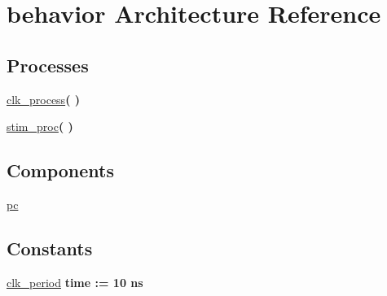 \hypertarget{class_p_counte__tb_1_1behavior}{\section{behavior \-Architecture \-Reference}
\label{class_p_counte__tb_1_1behavior}
}
\*
\*
\subsection*{\-Processes}
 \begin{DoxyCompactItemize}
\item 
\hypertarget{class_p_counte__tb_1_1behavior_ac5bb218131b813f7908ec89476b31fca}{\hyperlink{class_p_counte__tb_1_1behavior_ac5bb218131b813f7908ec89476b31fca}{clk\-\_\-process}{\bfseries  (  )}}\label{class_p_counte__tb_1_1behavior_ac5bb218131b813f7908ec89476b31fca}

\item 
\hypertarget{class_p_counte__tb_1_1behavior_ad2efa6785cff833c341e27596b21aeb5}{\hyperlink{class_p_counte__tb_1_1behavior_ad2efa6785cff833c341e27596b21aeb5}{stim\-\_\-proc}{\bfseries  (  )}}\label{class_p_counte__tb_1_1behavior_ad2efa6785cff833c341e27596b21aeb5}

\end{DoxyCompactItemize}
\subsection*{\-Components}
 \begin{DoxyCompactItemize}
\item 
\hypertarget{class_p_counte__tb_1_1behavior_aaf5ddd6f1a6925eba963bfefa161e9df}{\hyperlink{class_p_counte__tb_1_1behavior_aaf5ddd6f1a6925eba963bfefa161e9df}{pc}  {\bfseries }  }\label{class_p_counte__tb_1_1behavior_aaf5ddd6f1a6925eba963bfefa161e9df}

\end{DoxyCompactItemize}
\subsection*{\-Constants}
 \begin{DoxyCompactItemize}
\item 
\hypertarget{class_p_counte__tb_1_1behavior_a84fbaa8d4f8539ee8577e4f05d006dfb}{\hyperlink{class_p_counte__tb_1_1behavior_a84fbaa8d4f8539ee8577e4f05d006dfb}{clk\-\_\-period} {\bfseries time  \-:=  10  ns } }\label{class_p_counte__tb_1_1behavior_a84fbaa8d4f8539ee8577e4f05d006dfb}

\end{DoxyCompactItemize}
